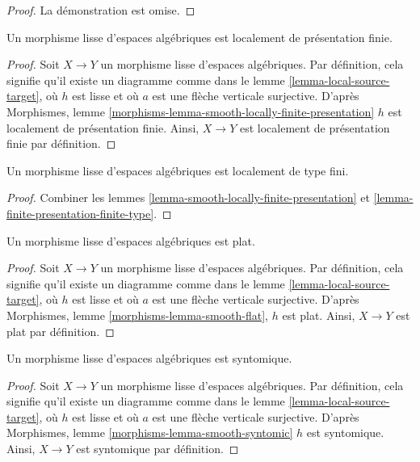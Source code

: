 \begin{proof}
La démonstration est omise.
\end{proof}

\begin{lemma}
\label{lemma-smooth-locally-finite-presentation}
Un morphisme lisse d'espaces algébriques est localement de présentation finie.
\end{lemma}

\begin{proof}
Soit $X \to Y$ un morphisme lisse d'espaces algébriques. Par
définition, cela signifie qu'il existe un diagramme comme dans le
lemme \ref{lemma-local-source-target},
où $h$ est lisse et où $a$ est une flèche verticale surjective. D'après
Morphismes, lemme \ref{morphisms-lemma-smooth-locally-finite-presentation}
$h$ est localement de présentation finie. Ainsi, $X \to Y$ est
localement de présentation finie par définition.
\end{proof}

\begin{lemma}
\label{lemma-smooth-locally-finite-type}
Un morphisme lisse d'espaces algébriques est localement de type fini.
\end{lemma}

\begin{proof}
Combiner les
lemmes \ref{lemma-smooth-locally-finite-presentation} et
\ref{lemma-finite-presentation-finite-type}.
\end{proof}

\begin{lemma}
\label{lemma-smooth-flat}
Un morphisme lisse d'espaces algébriques est plat.
\end{lemma}

\begin{proof}
Soit $X \to Y$ un morphisme lisse d'espaces algébriques. Par
définition, cela signifie qu'il existe un diagramme comme dans le
lemme \ref{lemma-local-source-target},
où $h$ est lisse et où $a$ est une flèche verticale surjective. D'après
Morphismes, lemme \ref{morphisms-lemma-smooth-flat},
$h$ est plat. Ainsi, $X \to Y$ est plat par définition.
\end{proof}

\begin{lemma}
\label{lemma-smooth-syntomic}
Un morphisme lisse d'espaces algébriques est syntomique.
\end{lemma}

\begin{proof}
Soit $X \to Y$ un morphisme lisse d'espaces algébriques. Par
définition, cela signifie qu'il existe un diagramme comme dans le
lemme \ref{lemma-local-source-target},
où $h$ est lisse et où $a$ est une flèche verticale surjective. D'après
Morphismes, lemme \ref{morphisms-lemma-smooth-syntomic}
$h$ est syntomique. Ainsi, $X \to Y$ est syntomique par définition.
\end{proof}

